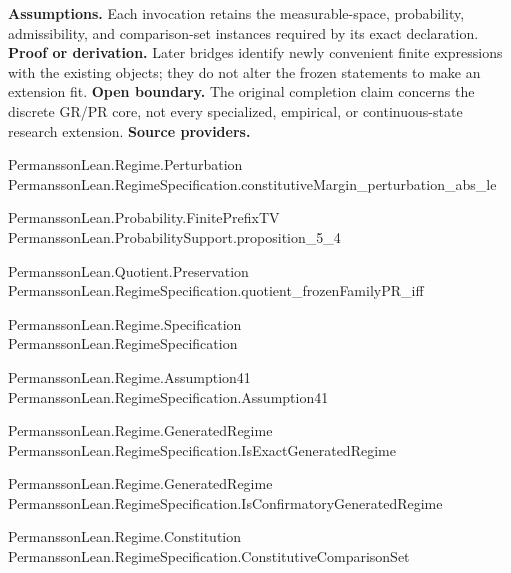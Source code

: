 \documentclass[11pt,a4paper]{article}
\begin{document}
\textbf{Assumptions.} Each invocation retains the measurable-space, probability, admissibility, and comparison-set instances required by its exact declaration.
\textbf{Proof or derivation.} Later bridges identify newly convenient finite expressions with the existing objects; they do not alter the frozen statements to make an extension fit.
\textbf{Open boundary.} The original completion claim concerns the discrete GR/PR core, not every specialized, empirical, or continuous-state research extension.
\textbf{Source providers.}
{\footnotesize\raggedright PermanssonLe\allowbreak{}an.Regime.Pe\allowbreak{}rturbation\\ PermanssonLe\allowbreak{}an.RegimeSpe\allowbreak{}cification.c\allowbreak{}onstitutiveM\allowbreak{}argin\_pertur\allowbreak{}bation\_abs\_l\allowbreak{}e\par}
{\footnotesize\raggedright PermanssonLe\allowbreak{}an.Probabili\allowbreak{}ty.FinitePre\allowbreak{}fixTV\\ PermanssonLe\allowbreak{}an.Probabili\allowbreak{}tySupport.pr\allowbreak{}oposition\_5\_\allowbreak{}4\par}
{\footnotesize\raggedright PermanssonLe\allowbreak{}an.Quotient.\allowbreak{}Preservation\\ PermanssonLe\allowbreak{}an.RegimeSpe\allowbreak{}cification.q\allowbreak{}uotient\_froz\allowbreak{}enFamilyPR\_i\allowbreak{}ff\par}
{\footnotesize\raggedright PermanssonLe\allowbreak{}an.Regime.Sp\allowbreak{}ecification\\ PermanssonLe\allowbreak{}an.RegimeSpe\allowbreak{}cification\par}
{\footnotesize\raggedright PermanssonLe\allowbreak{}an.Regime.As\allowbreak{}sumption41\\ PermanssonLe\allowbreak{}an.RegimeSpe\allowbreak{}cification.A\allowbreak{}ssumption41\par}
{\footnotesize\raggedright PermanssonLe\allowbreak{}an.Regime.Ge\allowbreak{}neratedRegim\allowbreak{}e\\ PermanssonLe\allowbreak{}an.RegimeSpe\allowbreak{}cification.I\allowbreak{}sExactGenera\allowbreak{}tedRegime\par}
{\footnotesize\raggedright PermanssonLe\allowbreak{}an.Regime.Ge\allowbreak{}neratedRegim\allowbreak{}e\\ PermanssonLe\allowbreak{}an.RegimeSpe\allowbreak{}cification.I\allowbreak{}sConfirmator\allowbreak{}yGeneratedRe\allowbreak{}gime\par}
{\footnotesize\raggedright PermanssonLe\allowbreak{}an.Regime.Co\allowbreak{}nstitution\\ PermanssonLe\allowbreak{}an.RegimeSpe\allowbreak{}cification.C\allowbreak{}onstitutiveC\allowbreak{}omparisonSet\par}
\end{document}
